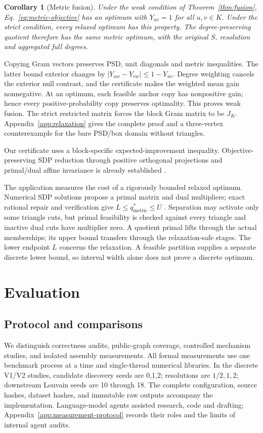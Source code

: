 \documentclass[sigconf,anonymous,review]{acmart}
\newtheorem{corollary}{Corollary}
\newcommand{\1}{\mathbf{1}}
\begin{document}
\begin{corollary}[Metric fusion]\label{cor:metric-fusion}
Under the weak condition of Theorem~\ref{thm:fusion},
Eq.~\eqref{eq:metric-objective} has an optimum with $Y_{uv}=1$ for all
$u,v\in K$. Under the strict condition, every relaxed optimum has this
property. The degree-preserving quotient therefore has the same metric
optimum, with the original $S$, resolution and aggregated full degrees.
\end{corollary}
Copying Gram vectors preserves PSD, unit diagonals and metric inequalities.
The latter bound exterior changes by
$|Y_{uw}-Y_{vw}|\leq1-Y_{uv}$. Degree weighting cancels the exterior null
contrast, and the certificate makes the weighted mean gain nonnegative.
At an optimum, each feasible anchor copy has nonpositive gain; hence every
positive-probability copy preserves optimality. This proves weak fusion.
The strict restricted matrix forces the block Gram matrix to be $J_K$.
Appendix~\ref{app:relaxation} gives the complete proof and a three-vertex
counterexample for the bare PSD/box domain without triangles.

Our certificate uses a block-specific expected-improvement inequality.
Objective-preserving SDP reduction through positive orthogonal projections
and primal/dual affine invariance is already established
\cite{permenter2020jordan}.

The application measures the cost of a rigorously bounded relaxed optimum.
Numerical SDP solutions propose a primal matrix and dual multipliers;
exact rational repair and verification give
$L\leq q^*_{\mathrm{metric}}\leq U$
\cite{jansson2008rigorous}. Separation may activate only some triangle cuts,
but primal feasibility is checked against every triangle and inactive dual
cuts have multiplier zero. A quotient primal lifts through the actual
memberships; its upper bound transfers through the relaxation-safe stages.
The lower endpoint $L$ concerns the relaxation. A feasible partition supplies
a separate discrete lower bound, so interval width alone does not prove a
discrete optimum.

\section{Evaluation}
\subsection{Protocol and comparisons}
We distinguish correctness audits, public-graph coverage, controlled mechanism
studies, and isolated assembly measurements. All formal measurements use one
benchmark process at a time and single-thread numerical libraries. In the
discrete V1/V2 studies, candidate discovery seeds are 0,1,2;
resolutions are $1/2,1,2$; downstream Louvain seeds
are 10 through 18. The complete configuration, source hashes, dataset hashes,
and immutable raw outputs accompany the implementation.
Language-model agents assisted research, code and drafting;
Appendix~\ref{app:measurement-protocol} records their roles and the limits of
internal agent audits.
\end{document}
